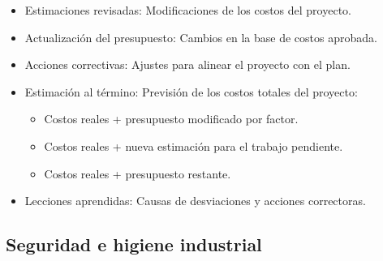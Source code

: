 \documentclass{article} %
\begin{document}
\begin{itemize}[label={},left=0pt,align=parleft]
    \item \begin{highlightbox}[levelone] Estimaciones revisadas: Modificaciones de los costos del proyecto. \end{highlightbox}
    \item \begin{highlightbox}[levelone] Actualización del presupuesto: Cambios en la base de costos aprobada. \end{highlightbox}
    \item \begin{highlightbox}[levelone] Acciones correctivas: Ajustes para alinear el proyecto con el plan. \end{highlightbox}
    \item \begin{highlightbox}[levelone] Estimación al término: Previsión de los costos totales del proyecto: \end{highlightbox}
    \begin{itemize}[label={},left=1em,align=parleft]
        \item \begin{highlightbox}[leveltwo] Costos reales + presupuesto modificado por factor. \end{highlightbox}
        \item \begin{highlightbox}[leveltwo] Costos reales + nueva estimación para el trabajo pendiente. \end{highlightbox}
        \item \begin{highlightbox}[leveltwo] Costos reales + presupuesto restante. \end{highlightbox}
    \end{itemize}
    \item \begin{highlightbox}[levelone] Lecciones aprendidas: Causas de desviaciones y acciones correctoras. \end{highlightbox}
\end{itemize}

\subsection{Seguridad e higiene industrial}
\end{document}
